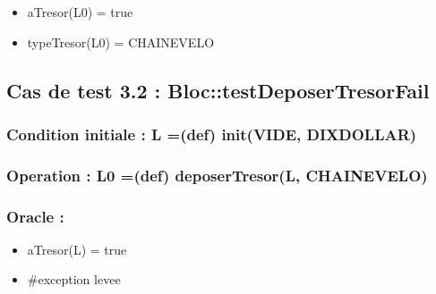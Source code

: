 \documentclass[11pt]{article}
\begin{document}
\begin{itemize}

\item aTresor(L0) = true\\
\label{sec-1.5.3.1}


\item typeTresor(L0) = CHAINEVELO\\
\label{sec-1.5.3.2}


\end{itemize} %
\subsection{Cas de test 3.2 : Bloc::testDeposerTresorFail}
\label{sec-1.6}

\subsubsection{Condition initiale : L =(def) init(VIDE, DIXDOLLAR)}
\label{sec-1.6.1}

\subsubsection{Operation : L0 =(def) deposerTresor(L, CHAINEVELO)}
\label{sec-1.6.2}

\subsubsection{Oracle :}
\label{sec-1.6.3}

\begin{itemize}

\item aTresor(L) = true\\
\label{sec-1.6.3.1}


\item \#exception levee\\
\label{sec-1.6.3.2}

\end{itemize} %
\end{document}
